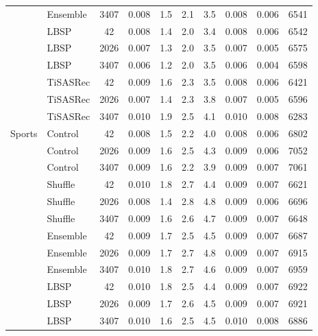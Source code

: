 \begin{longtable}{@{}llS[table-format=4.0]S[table-format=1.3]S[table-format=2.1]S[table-format=2.1]S[table-format=2.1]S[table-format=1.3]S[table-format=1.3]S[table-format=5.0]@{}}
 & Ensemble & 3407 & 0.008 & 1.5 & 2.1 & 3.5 & 0.008 & 0.006 & 6541\\ %
 & LBSP & 42 & 0.008 & 1.4 & 2.0 & 3.4 & 0.008 & 0.006 & 6542\\ %
 & LBSP & 2026 & 0.007 & 1.3 & 2.0 & 3.5 & 0.007 & 0.005 & 6575\\ %
 & LBSP & 3407 & 0.006 & 1.2 & 2.0 & 3.5 & 0.006 & 0.004 & 6598\\ %
 & TiSASRec & 42 & 0.009 & 1.6 & 2.3 & 3.5 & 0.008 & 0.006 & 6421\\ %
 & TiSASRec & 2026 & 0.007 & 1.4 & 2.3 & 3.8 & 0.007 & 0.005 & 6596\\ %
 & TiSASRec & 3407 & 0.010 & 1.9 & 2.5 & 4.1 & 0.010 & 0.008 & 6283\\ %
\midrule
Sports & Control & 42 & 0.008 & 1.5 & 2.2 & 4.0 & 0.008 & 0.006 & 6802\\ %
 & Control & 2026 & 0.009 & 1.6 & 2.5 & 4.3 & 0.009 & 0.006 & 7052\\ %
 & Control & 3407 & 0.009 & 1.6 & 2.2 & 3.9 & 0.009 & 0.007 & 7061\\ %
 & Shuffle & 42 & 0.010 & 1.8 & 2.7 & 4.4 & 0.009 & 0.007 & 6621\\ %
 & Shuffle & 2026 & 0.008 & 1.4 & 2.8 & 4.8 & 0.009 & 0.006 & 6696\\ %
 & Shuffle & 3407 & 0.009 & 1.6 & 2.6 & 4.7 & 0.009 & 0.007 & 6648\\ %
 & Ensemble & 42 & 0.009 & 1.7 & 2.5 & 4.5 & 0.009 & 0.007 & 6687\\ %
 & Ensemble & 2026 & 0.009 & 1.7 & 2.7 & 4.8 & 0.009 & 0.007 & 6915\\ %
 & Ensemble & 3407 & 0.010 & 1.8 & 2.7 & 4.6 & 0.009 & 0.007 & 6959\\ %
 & LBSP & 42 & 0.010 & 1.8 & 2.5 & 4.4 & 0.009 & 0.007 & 6922\\ %
 & LBSP & 2026 & 0.009 & 1.7 & 2.6 & 4.5 & 0.009 & 0.007 & 6921\\ %
 & LBSP & 3407 & 0.010 & 1.6 & 2.5 & 4.5 & 0.010 & 0.008 & 6886\\ %

\end{longtable}
